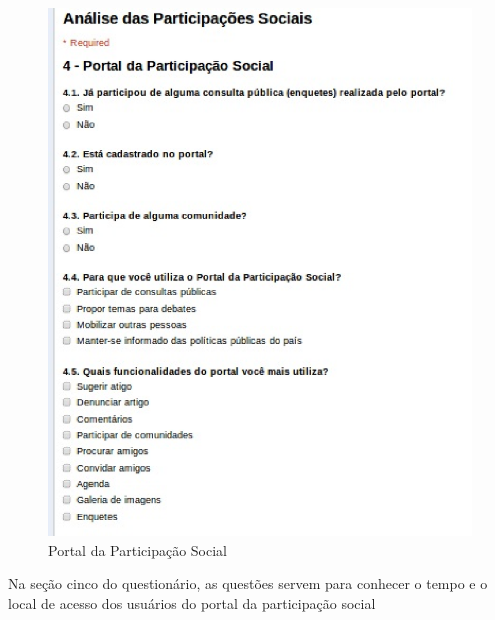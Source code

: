 \begin{figure}[!h]
    \centering
    \includegraphics[keepaspectratio=true,scale=0.60]
      {figuras/perf5.eps}
    \caption{Portal da Participação Social}
    \label{participabr}
\end{figure}


\newpage

	Na seção cinco do questionário, as questões servem para conhecer o tempo e o local de acesso dos usuários do portal da participação social




